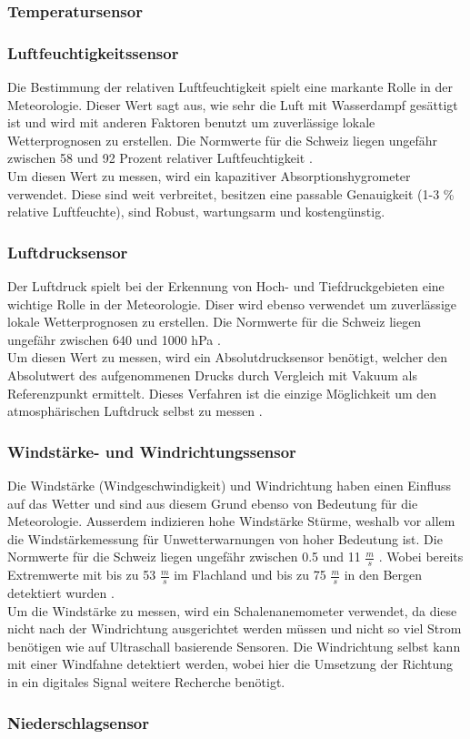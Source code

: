 
\subsubsection{Temperatursensor}

\subsubsection{Luftfeuchtigkeitssensor}
Die Bestimmung der relativen Luftfeuchtigkeit spielt eine markante Rolle in der Meteorologie. Dieser Wert sagt aus, wie sehr die Luft mit Wasserdampf gesättigt ist und wird mit anderen Faktoren benutzt um zuverlässige lokale Wetterprognosen zu erstellen. Die Normwerte für die Schweiz liegen ungefähr zwischen 58 und 92 Prozent relativer Luftfeuchtigkeit  \cite{MeteoSchweizFeuchte}.\\
Um diesen Wert zu messen, wird ein kapazitiver Absorptionshygrometer verwendet. Diese sind weit verbreitet, besitzen eine passable Genauigkeit (1-3 \% relative Luftfeuchte), sind Robust, wartungsarm und kostengünstig.

\subsubsection{Luftdrucksensor}
Der Luftdruck spielt bei der Erkennung von Hoch- und Tiefdruckgebieten eine wichtige Rolle in der Meteorologie. Diser wird ebenso verwendet um zuverlässige lokale Wetterprognosen zu erstellen. Die Normwerte für die Schweiz liegen ungefähr zwischen 640 und 1000 hPa \cite{MeteoSchweizDruck}.\\
Um diesen Wert zu messen, wird ein Absolutdrucksensor benötigt, welcher den Absolutwert des aufgenommenen Drucks durch Vergleich mit Vakuum als Referenzpunkt ermittelt. Dieses Verfahren ist die einzige Möglichkeit um den atmosphärischen Luftdruck selbst zu messen \cite{WikiDruck}. 

\subsubsection{Windstärke- und Windrichtungssensor}
Die Windstärke (Windgeschwindigkeit) und Windrichtung haben einen Einfluss auf das Wetter und sind aus diesem Grund ebenso von Bedeutung für die Meteorologie. Ausserdem indizieren hohe Windstärke Stürme, weshalb vor allem die Windstärkemessung für Unwetterwarnungen von hoher Bedeutung ist. Die Normwerte für die Schweiz liegen ungefähr zwischen 0.5 und 11 $\frac{m}{s}$ \cite{MeteoSchweizWindnorm}. Wobei bereits Extremwerte mit bis zu 53 $\frac{m}{s}$ im Flachland und bis zu 75 $\frac{m}{s}$ in den Bergen detektiert wurden \cite{MeteoSchweizExtrem}.\\
Um die Windstärke zu messen, wird ein Schalenanemometer verwendet, da diese nicht nach der Windrichtung ausgerichtet werden müssen und nicht so viel Strom benötigen wie auf Ultraschall basierende Sensoren. Die Windrichtung selbst kann mit einer Windfahne detektiert werden, wobei hier die Umsetzung der Richtung in ein digitales Signal weitere Recherche benötigt.

\subsubsection{Niederschlagsensor}
